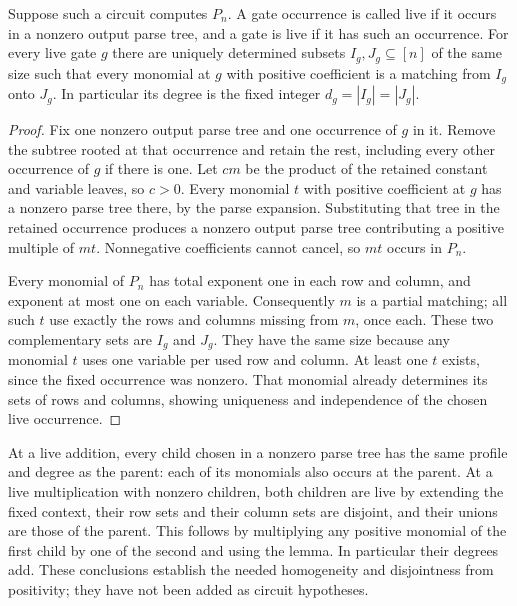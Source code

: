 \begin{lemma}\label{lem:per-live-gate-profile}
Suppose such a circuit computes $P_n$. A gate occurrence is called
live if it occurs in a nonzero output parse tree, and a gate is live
if it has such an occurrence. For every live gate $g$ there are
uniquely determined subsets $I_g,J_g\subseteq[n]$ of the same size
such that every monomial at $g$ with positive coefficient is a
matching from $I_g$ onto $J_g$. In particular its degree is the
fixed integer $d_g=|I_g|=|J_g|$.
\end{lemma}
\begin{proof}
Fix one nonzero output parse tree and one occurrence of $g$ in it.
Remove the subtree rooted at that occurrence and retain the rest,
including every other occurrence of $g$ if there is one. Let $c m$
be the product of the retained constant and variable leaves, so
$c>0$. Every monomial $t$ with positive coefficient at $g$ has a
nonzero parse tree there, by the parse expansion. Substituting that
tree in the retained occurrence produces a nonzero output parse
tree contributing a positive multiple of $mt$. Nonnegative
coefficients cannot cancel, so $mt$ occurs in $P_n$.

Every monomial of $P_n$ has total exponent one in each row and
column, and exponent at most one on each variable. Consequently
$m$ is a partial matching; all such $t$ use exactly the rows and
columns missing from $m$, once each. These two complementary
sets are $I_g$ and $J_g$. They have the same size because any
monomial $t$ uses one variable per used row and column. At least
one $t$ exists, since the fixed occurrence was nonzero. That
monomial already determines its sets of rows and columns,
showing uniqueness and independence of the chosen live occurrence.
\end{proof}

At a live addition, every child chosen in a nonzero parse tree has
the same profile and degree as the parent: each of its monomials
also occurs at the parent. At a live multiplication with nonzero
children, both children are live by extending the fixed context,
their row sets and their column sets are disjoint, and their unions
are those of the parent. This follows by multiplying any positive
monomial of the first child by one of the second and using the
lemma. In particular their degrees add. These conclusions establish
the needed homogeneity and disjointness from positivity; they have
not been added as circuit hypotheses.

